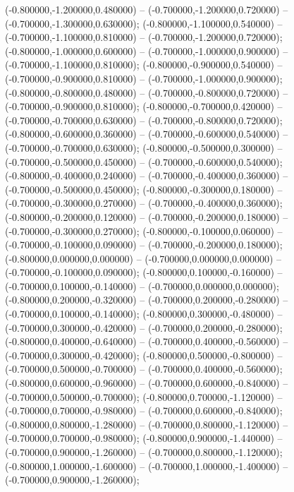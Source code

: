  (-0.800000,-1.200000,0.480000) -- (-0.700000,-1.200000,0.720000) -- (-0.700000,-1.300000,0.630000);
 (-0.800000,-1.100000,0.540000) -- (-0.700000,-1.100000,0.810000) -- (-0.700000,-1.200000,0.720000);
 (-0.800000,-1.000000,0.600000) -- (-0.700000,-1.000000,0.900000) -- (-0.700000,-1.100000,0.810000);
 (-0.800000,-0.900000,0.540000) -- (-0.700000,-0.900000,0.810000) -- (-0.700000,-1.000000,0.900000);
 (-0.800000,-0.800000,0.480000) -- (-0.700000,-0.800000,0.720000) -- (-0.700000,-0.900000,0.810000);
 (-0.800000,-0.700000,0.420000) -- (-0.700000,-0.700000,0.630000) -- (-0.700000,-0.800000,0.720000);
 (-0.800000,-0.600000,0.360000) -- (-0.700000,-0.600000,0.540000) -- (-0.700000,-0.700000,0.630000);
 (-0.800000,-0.500000,0.300000) -- (-0.700000,-0.500000,0.450000) -- (-0.700000,-0.600000,0.540000);
 (-0.800000,-0.400000,0.240000) -- (-0.700000,-0.400000,0.360000) -- (-0.700000,-0.500000,0.450000);
 (-0.800000,-0.300000,0.180000) -- (-0.700000,-0.300000,0.270000) -- (-0.700000,-0.400000,0.360000);
 (-0.800000,-0.200000,0.120000) -- (-0.700000,-0.200000,0.180000) -- (-0.700000,-0.300000,0.270000);
 (-0.800000,-0.100000,0.060000) -- (-0.700000,-0.100000,0.090000) -- (-0.700000,-0.200000,0.180000);
 (-0.800000,0.000000,0.000000) -- (-0.700000,0.000000,0.000000) -- (-0.700000,-0.100000,0.090000);
 (-0.800000,0.100000,-0.160000) -- (-0.700000,0.100000,-0.140000) -- (-0.700000,0.000000,0.000000);
 (-0.800000,0.200000,-0.320000) -- (-0.700000,0.200000,-0.280000) -- (-0.700000,0.100000,-0.140000);
 (-0.800000,0.300000,-0.480000) -- (-0.700000,0.300000,-0.420000) -- (-0.700000,0.200000,-0.280000);
 (-0.800000,0.400000,-0.640000) -- (-0.700000,0.400000,-0.560000) -- (-0.700000,0.300000,-0.420000);
 (-0.800000,0.500000,-0.800000) -- (-0.700000,0.500000,-0.700000) -- (-0.700000,0.400000,-0.560000);
 (-0.800000,0.600000,-0.960000) -- (-0.700000,0.600000,-0.840000) -- (-0.700000,0.500000,-0.700000);
 (-0.800000,0.700000,-1.120000) -- (-0.700000,0.700000,-0.980000) -- (-0.700000,0.600000,-0.840000);
 (-0.800000,0.800000,-1.280000) -- (-0.700000,0.800000,-1.120000) -- (-0.700000,0.700000,-0.980000);
 (-0.800000,0.900000,-1.440000) -- (-0.700000,0.900000,-1.260000) -- (-0.700000,0.800000,-1.120000);
 (-0.800000,1.000000,-1.600000) -- (-0.700000,1.000000,-1.400000) -- (-0.700000,0.900000,-1.260000);
